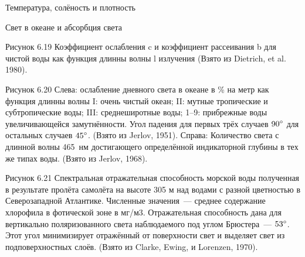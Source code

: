 \begin{chapter}{Температура, солёность и плотность}
\begin{section}{Свет в океане и абсорбция света}

Рисунок 6.19 Коэффициент ослабления c и коэффициент рассеивания b для
чистой воды как функция длинны волны l излучения (Взято из Dietrich,
et al. 1980).

Рисунок 6.20 Слева: ослабление дневного света в океане в \% на метр
как функция длинны волны I: очень чистый океан; II: мутные тропические
и субтропические воды; III: среднеширотные воды; 1--9: прибрежные воды
увеличивающейся замутнённости. Угол падения для первых трёх случаев
${90}^\circ$ для остальных случаев ${45}^\circ$. (Взято из Jerlov,
1951). Справа: Количество света с длинной волны 465~нм достигающего
определённой индикаторной глубины в тех же типах воды. (Взято из
Jerlov, 1968).

Рисунок 6.21 Спектральная отражательная способность морской воды
полученная в результате пролёта самолёта на высоте 305 м над водами с
разной цветностью в Северозападной Атлантике. Численные значения~---
среднее содержание хлорофила в фотической зоне в мг/м3. Отражательная
способность дана для вертикально поляризованного света наблюдаемого
под углом Брюстера~--- ${53}^\circ$. Этот угол минимизирует отражённый от
поверхности свет и выделяет свет из подповерхностных слоёв. (Взято из
Clarke, Ewing, и Lorenzen, 1970).


\end{section}
\end{chapter}
